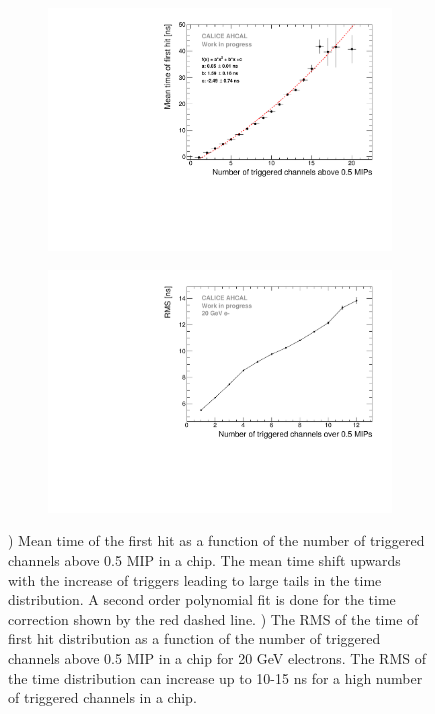 \begin{figure}[htbp!]
	\begin{subfigure}[t]{0.5\textwidth}
		\centering
		\includegraphics[width=1\textwidth]{../Thesis_Plots/Timing/Electrons/Plots/NumberHits_Dependance_AllEnergies.pdf}
		\caption{}\label{fig:nhits_profile}
	\end{subfigure}
	\hfill
	\begin{subfigure}[t]{0.5\textwidth}
		\centering
		\includegraphics[width=1\textwidth]{../Thesis_Plots/Timing/Electrons/Plots/ParametrisationPedestalShift_20GeV.pdf}
		\caption{}\label{fig:RMS_nHits}
	\end{subfigure}
	\caption{) Mean time of the first hit as a function of the number of triggered channels above 0.5 MIP in a chip. The mean time shift upwards with the increase of triggers leading to large tails in the time distribution. A second order polynomial fit is done for the time correction shown by the red dashed line. ) The RMS of the time of first hit distribution as a function of the number of triggered channels above 0.5 MIP in a chip for 20 GeV electrons. The RMS of the time distribution can increase up to 10-15 ns for a high number of triggered channels in a chip.}
\end{figure}

